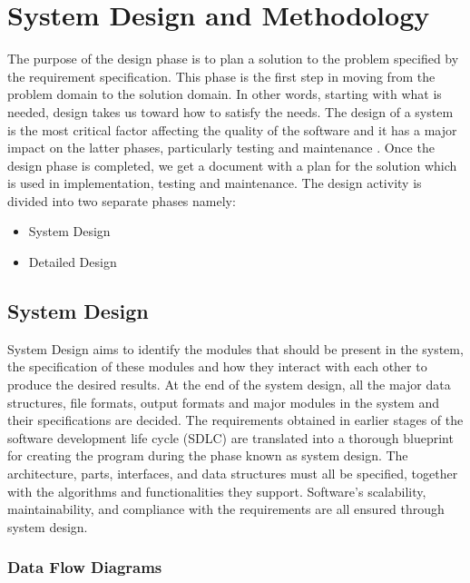 \chapter{System Design and Methodology}
\label{Systemdesign}
The purpose of the design phase is to plan a solution to the problem specified by the requirement specification. This phase is the first step in moving from the problem domain to the solution domain. In other words, starting with what is needed, design takes us toward how to satisfy the needs. The design of a system is the most critical factor affecting
the quality of the software and it has a major impact on the latter phases, particularly testing and maintenance . Once the design phase is completed, we get a document with a plan for the solution which is used in implementation, testing and maintenance. The design activity is divided into two separate phases namely:
\begin{itemize}
    \item System Design
    \item Detailed Design
\end{itemize}
\section{System Design}
System Design aims to identify the modules that should be present in the system, the specification of these modules and how they interact with each other to produce the desired results. At the end of the system design, all the major data structures, file formats, output formats and major modules in the system and their specifications are decided.
The requirements obtained in earlier stages of the software development life cycle (SDLC) are translated into a thorough blueprint for creating the program during the phase known as system design. The architecture, parts, interfaces, and data structures must all be specified, together with the algorithms and functionalities they support. Software’s scalability, maintainability, and compliance with the requirements are all ensured through system design.
\newpage
\subsection{Data Flow Diagrams}
